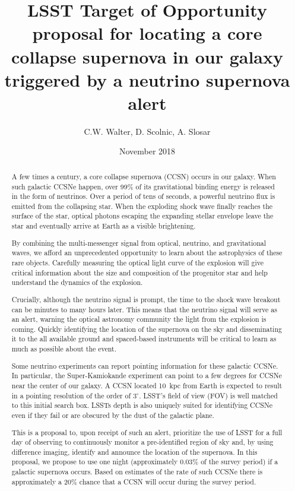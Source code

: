 \documentclass[12pt, letterpaper]{article}
\title{LSST Target of Opportunity proposal for locating a core collapse
  supernova in our galaxy triggered by a neutrino supernova alert}
\author{ C.W. Walter, D. Scolnic, A. Slosar}
\date{ November 2018}
\begin{document}
\maketitle

\begin{abstract}

  A few times a century, a core collapse supernova (CCSN) occurs in
  our galaxy. When such galactic CCSNe happen, over 99\% of its
  gravitational binding energy is released in the form of neutrinos.
  Over a period of tens of seconds, a powerful neutrino flux is emitted
  from the collapsing star.  When the exploding shock wave finally
  reaches the surface of the star, optical photons escaping the
  expanding stellar envelope leave the star and eventually arrive at
  Earth as a visible brightening.

  By combining the multi-messenger signal from optical, neutrino, and
  gravitational waves, we afford an unprecedented opportunity to learn
  about the astrophysics of these rare objects. Carefully measuring
  the optical light curve of the explosion will give critical
  information about the size and composition of the progenitor star
  and help understand the dynamics of the explosion.

  Crucially, although the neutrino signal is prompt, the time to the
  shock wave breakout can be minutes to many hours later.  This means
  that the neutrino signal will serve as an alert, warning the
  optical astronomy community the light from the explosion is coming.  
  Quickly identifying the location of the supernova on the sky and
  disseminating it to the all available ground and spaced-based
  instruments will be critical to learn as much as possible about the
  event.

  Some neutrino experiments can report pointing information for these
  galactic CCSNe. In particular, the Super-Kamiokande experiment can
  point to a few degrees for CCSNe near the center of our galaxy.  A
  CCSN located 10~kpc from Earth is expected to result in a pointing
  resolution of the order of $3^\circ$.  LSST's field of view (FOV) is
  well matched to this initial search box.  LSSTs depth is also
  uniquely suited for identifying CCSNe even if they fail or are
  obscured by the dust of the galactic plane.

  This is a proposal to, upon receipt of such an alert, prioritize the
  use of LSST for a full day of observing to continuously monitor a
  pre-identified region of sky and, by using difference imaging,
  identify and announce the location of the supernova. In this
  proposal, we propose to use one night (approximately 0.03\% of the
  survey period) if a galactic supernova occurs.  Based on estimates
  of the rate of such CCSNe there is approximately a 20\% chance that a
  CCSN will occur during the survey period.
  
\end{abstract}
\end{document}
